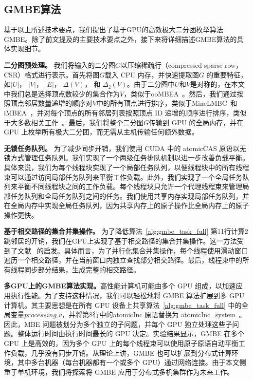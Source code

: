 \subsection{GMBE算法}

基于以上所述技术要点，我们提出了基于GPU的高效极大二分团枚举算法GMBE。除了前文提及的主要技术要点之外，接下来将详细描述GMBE算法的具体实现细节。

\textbf{二分图预处理。} 我们将输入的二分图$G$以压缩稀疏行（compressed sparse row，CSR）格式进行表示。首先将图$G$载入 CPU 内存，并快速提取图$G$ 的重要特征，如$|U|$， $|V|$， $|E|$， 
$\Delta(V)$， 和 $\Delta_2(V)$。由于二分图中$U$和$V$是对称的，在本文中我们总是选择顶点数较少的集合作为$V$，类似于ooMBEA~\cite{ooMBE22}。然后，我们通过按照顶点邻居数量递增的顺序对$V$中的所有顶点进行排序，类似于MineLMBC~\cite{minel06}和iMBEA~\cite{iMBEA14}，并对每个顶点的所有邻居列表按照顶点 ID 递增的顺序进行排序，类似于大多数相关工作~\cite{g2miner22,Kclique22}。最后，我们将整个二分图$G$传输到 GPU 的全局内存，并在 GPU 上枚举所有极大二分团，而无需从主机传输任何额外数据。

\textbf{无锁任务队列。} 为了减少同步开销，我们使用 CUDA 中的 \textsf{atomicCAS} 原语以无锁方式管理任务队列。我们实现了一个两级任务排队机制以进一步改善负载平衡。具体来说，我们为每个线程块实现了一个局部任务队列，以便线程块中的所有线程束可以通过访问局部任务队列来平衡工作负载。此外，我们实现了一个全局任务队列来平衡不同线程块之间的工作负载。每个线程块只允许一个代理线程束来管理局部任务队列和全局任务队列之间的任务。我们使用共享内存实现局部任务队列，并在全局内存中实现全局任务队列，因为共享内存上的原子操作比全局内存上的原子操作更快。

\textbf{基于相交路径的集合并集操作。} 为了降低算法~\ref{alg:gmbe_task_full} 第11行计算2跳邻居的开销，我们在GPU上实现了基于相交路径的集合并集操作。这一方法受到了文献~\cite{GpuMergePathIntersect14} 的启发。具体而言，为了并行化集合并集操作，每个线程使用滑动窗口遍历一个相交路径，并在当前窗口内独立查找部分相交路径。最后，线程束中的所有线程同步部分结果，生成完整的相交路径。

\textbf{多GPU上的GMBE算法实现。}高性能计算机可能由多个 GPU 组成，以加速应用执行性能。为了支持这种情况，我们可以轻松地将 GMBE 算法扩展到多 GPU 计算机。其主要思想是在所有 GPU 设备上共享算法~\ref{alg:gmbe_task_full} 中的全局变量$processing\_v$，并将第8行中的\textsf{atomicInc} 原语替换为 \textsf{atomicInc\_system}~\cite{CUDAProgrammingGuide}。因此，MBE 问题被划分为多个独立的子问题，并每个 GPU 独立处理这些子问题。整体运行时间由执行时间最长的 GPU 决定。实验结果显示，GMBE 在多个 GPU 上是高效的，因为多个 GPU 上的每个线程束可以使用原子原语自动平衡工作负载，几乎没有同步开销。从理论上讲，GMBE 也可以扩展到分布式计算环境，其中多台机器（每台机器都有一个或多个 GPU）通过网络连接。由于本文侧重于单机环境，我们将探索将 GMBE 应用于分布式多机集群作为未来工作。


